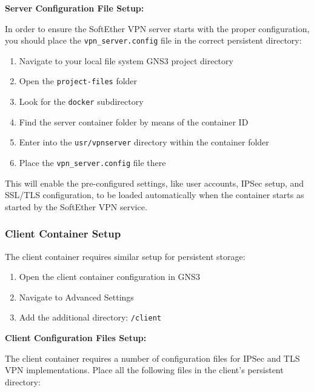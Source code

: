 \noindent
\textbf{Server Configuration File Setup:}

\noindent
In order to ensure the SoftEther VPN server starts with the proper configuration, you should place the \texttt{vpn\_server.config} file in the correct persistent directory:

\begin{enumerate}
    \item Navigate to your local file system GNS3 project directory 
    \item Open the \texttt{project-files} folder
    \item Look for the \texttt{docker} subdirectory
    \item Find the server container folder by means of the container ID
    \item Enter into the \texttt{usr/vpnserver} directory within the container folder
    \item Place the \texttt{vpn\_server.config} file there
\end{enumerate}

\noindent
This will enable the pre-configured settings, like user accounts, IPSec setup, and SSL/TLS configuration, to be loaded automatically when the container starts as started by the SoftEther VPN service.

\subsubsection{Client Container Setup}

The client container requires similar setup for persistent storage:

\begin{enumerate}
    \item Open the client container configuration in GNS3
    \item Navigate to Advanced Settings  
    \item Add the additional directory: \texttt{/client}
\end{enumerate}

\noindent
\textbf{Client Configuration Files Setup:}

\noindent
The client container requires a number of configuration files for IPSec and TLS VPN implementations. Place all the following files in the client's persistent directory:

